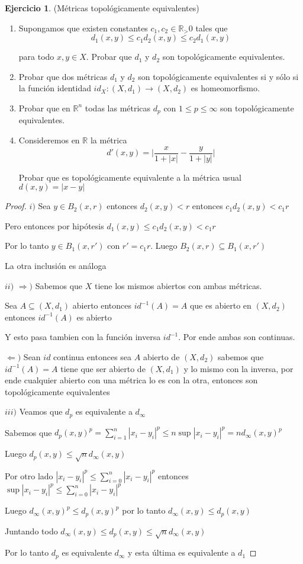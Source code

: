 \documentclass[12pt]{article}
\newcommand{\R}{\mathbb{R}}
\newcommand{\Ra}{\Rightarrow}
\newcommand{\ra}{\rightarrow}
\theoremstyle{definition}
\newtheorem{ej}{Ejercicio}
\begin{document}
 \begin{ej}
   (Métricas topológicamente equivalentes)
     \begin{enumerate}
     \item Supongamos que existen constantes $c_1,c_2 \in \R_>0$ tales que
       $$ d_1(x,y) \leq c_1 d_2(x,y) \leq c_2d_1(x,y)$$

       para todo $x,y \in X$. Probar que $d_1$ y $d_2$ son topológicamente equivalentes.
     \item Probar que dos métricas $d_1$ y $d_2$ son topológicamente equivalentes si y sólo si la función identidad $id_X : (X,d_1) \ra (X,d_2)$ es homeomorfismo.
     \item Probar que en $\R^n$ todas las métricas $d_p$ con $1 \leq p \leq \infty$ son topológicamente equivalentes.
     \item Consideremos en $\R$ la métrica 
       $$ d'(x,y)= \biggl |\frac{x}{1 + |x|} - \frac{y}{1 + |y|} \biggl | $$

       Probar que es topológicamente equivalente a la métrica usual $d(x,y)= |x-y|$
   \end{enumerate}
   \begin{proof}
   $i)$ Sea $y \in B_2(x,r)$ entonces $d_2(x,y) < r$ entonces $c_1 d_2(x,y) < c_1  r$ 

   Pero entonces por hipótesis $d_1(x,y) \leq c_1d_2(x,y) < c_1r$ 

   Por lo tanto $y \in B_1(x,r')$ con $r' = c_1r$. Luego $B_2(x,r) \subseteq B_1(x,r')$

   La otra inclusión es análoga

 $ii)$ $\Ra )$ Sabemos que $X$ tiene los mismos abiertos con ambas métricas.

 Sea $A \subseteq (X,d_1)$ abierto entonces $id^{-1}(A) = A$ que es abierto en $(X,d_2)$ entonces $id^{-1}(A)$ es abierto

 Y esto pasa tambien con la función inversa $id^{-1}$. Por ende ambas son continuas.


 $\Leftarrow ) $ Sean $id$ continua entonces sea $A$ abierto de $(X,d_2)$ sabemos que $id^{-1}(A) = A$ tiene que ser abierto de $(X,d_1)$ y lo mismo con la inversa, por ende cualquier abierto con una métrica lo es con la otra, entonces son topológicamente equivalentes 

 $iii)$ Veamos que $d_p$ es equivalente a $d_{\infty}$ 

 Sabemos que $d_p(x,y)^p = \sum_{i =1 }^n |x_i - y_i|^p \leq n \sup | x_i - y_i | ^p = n d_{\infty}(x,y)^p$

 Luego $d_p(x,y) \leq \sqrt nd_{\infty}(x,y)$

 Por otro lado $|x_i - y_i|^p \leq \sum_{i=0}^n |x_i - y_i|^p$ entonces $\sup |x_i - y_i|^p \leq \sum_{i=0}^n |x_i -y_i|^p$

 Luego $d_{\infty}(x,y)^p \leq d_p(x,y)^p $ por lo tanto $d_{\infty}(x,y) \leq d_p(x,y)$

 Juntando todo $d_{\infty}(x,y) \leq d_p(x,y) \leq \sqrt n d_{\infty}(x,y)$

 Por lo tanto $d_p$ es equivalente $d_{\infty}$ y esta última es equivalente a $d_1$
   \end{proof}
 \end{ej}
\end{document}
